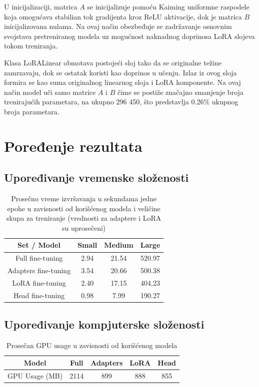 \documentclass[12pt,oneside]{memoir}
\begin{document}
U inicijalizaciji, matrica $A$ se inicijalizuje pomoću Kaiming\cite{he2015delving} uniformne raspodele koja omogućava stabilian tok gradijenta kroz ReLU aktivacije, dok je matrica $B$ inicijalizovana nulama. Na ovaj način obezbeđuje se zadržavanje osnovnim svojstava pretreniranog modela uz mogućnost naknadnog doprinosa LoRA slojeva tokom treniranja.

Klasa LoRALinear obmotava postojeći sloj tako da se originalne težine zamrzavaju, dok se ostatak koristi kao doprinos u učenju. Izlaz iz ovog sloja formira se kao suma originalnog linearnog sloja i LoRA komponente. Na ovaj način model uči samo matrice $A$ i $B$ čime se postiže značajno smanjenje broja trenirajućih parametara, na ukupno 296 450, što predstavlja 0.26\% ukupnog broja parametara.

\chapter{Poređenje rezultata}


\section{Upoređivanje vremenske složenosti}
\begin{table}[h!]
	\centering
	\setlength{\tabcolsep}{12pt}
	\renewcommand{\arraystretch}{3}
	\begin{tabular}{|c|c|c|c|} 
		\hline
		Set / Model & Small & Medium & Large \\
		\hline
		Full fine-tuning & 2.94 & 21.54 & 520.97 \\ 
		\hline
		Adapters fine-tuning & 3.54 & 20.66 & 500.38 \\ 
		\hline
		LoRA fine-tuning & 2.40 & 17.15 & 404.23 \\ 
		\hline
		Head fine-tuning & 0.98 & 7.99 & 190.27 \\ 
		\hline
	\end{tabular}
	\caption{Prosečno vreme izvršavanja u sekundama jedne epohe u zavisnosti od korišćenog modela i veličine skupa za treniranje (vrednosti za adaptere i LoRA su uprosečeni)}
	\label{tab:TrainingStatsEpochTime}
\end{table}

\section{Upoređivanje kompjuterske složenosti}
\begin{table}[h!]
	\centering
	\setlength{\tabcolsep}{12pt}
	\renewcommand{\arraystretch}{3}
	\begin{tabular}{|c|c|c|c|c|} 
		\hline
		Model & Full  & Adapters & LoRA  & Head \\
		\hline
		GPU Usage (MB) & 2114 & 899 & 888 & 855 \\ 
		\hline
	\end{tabular}
	\caption{Prosečan GPU usage u zavisnosti od korišćenog modela}
	\label{tab:TrainingStatsGPUUsage}
\end{table}
\end{document}
